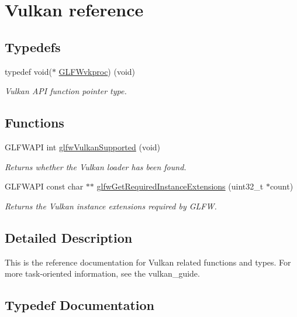 \hypertarget{group__vulkan}{}\section{Vulkan reference}
\label{group__vulkan}
\subsection*{Typedefs}
\begin{DoxyCompactItemize}
\item 
typedef void($\ast$ \hyperlink{group__vulkan_ga70c01918dc9d233a4fbe0681a43018af}{G\+L\+F\+Wvkproc}) (void)
\begin{DoxyCompactList}\small\item\em Vulkan A\+PI function pointer type. \end{DoxyCompactList}\end{DoxyCompactItemize}
\subsection*{Functions}
\begin{DoxyCompactItemize}
\item 
G\+L\+F\+W\+A\+PI int \hyperlink{group__vulkan_ga72e7c3757d9ff2333181a5569bb7c403}{glfw\+Vulkan\+Supported} (void)
\begin{DoxyCompactList}\small\item\em Returns whether the Vulkan loader has been found. \end{DoxyCompactList}\item 
G\+L\+F\+W\+A\+PI const char $\ast$$\ast$ \hyperlink{group__vulkan_ga70adaf0cfc99adc484c49ea99e17c2cf}{glfw\+Get\+Required\+Instance\+Extensions} (uint32\+\_\+t $\ast$count)
\begin{DoxyCompactList}\small\item\em Returns the Vulkan instance extensions required by G\+L\+FW. \end{DoxyCompactList}\end{DoxyCompactItemize}


\subsection{Detailed Description}
This is the reference documentation for Vulkan related functions and types. For more task-\/oriented information, see the vulkan\+\_\+guide. 

\subsection{Typedef Documentation}
\mbox{\label{group__vulkan_ga70c01918dc9d233a4fbe0681a43018af}} 
